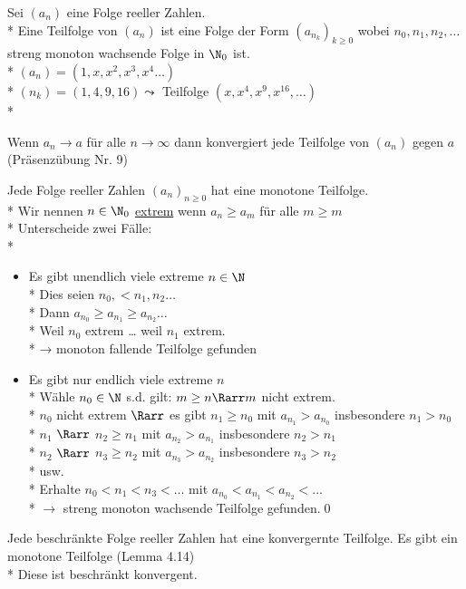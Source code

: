 Sei $(a_n)$ eine Folge reeller Zahlen.\\*
Eine Teilfolge von $(a_n)$ ist eine Folge der Form $(a_{n_k})_{k \geq 0}$ wobei $n_0, n_1, n_2,…$ streng monoton wachsende Folge in $\N_0$ ist.\\*
\bsp
$(a_n) = (1, x, x^2, x^3 , x^4 …)$\\*
$(n_k) = (1, 4, 9, 16) \leadsto $ Teilfolge $(x, x^4, x^9, x^{16} ,…)$\\*

Wenn $a_n \to a$ für alle $n \to \infty$ dann konvergiert jede Teilfolge von $(a_n)$ gegen $a$ (Präsenzübung Nr. 9)

Jede Folge reeller Zahlen $(a_n)_{n\geq 0}$ hat eine monotone Teilfolge.\\*
%
\bew
Wir nennen $n\in \N_0$ \underline{extrem} wenn $a_n \geq a_m$ für alle $m \geq m$\\*
Unterscheide zwei Fälle:\\*
\begin{itemize}
    \item{Es gibt unendlich viele extreme $n \in \N$\\*
Dies seien $n_0, < n_1, n_2…$\\*
Dann $a_{n_0} \geq a_{n_1} \geq a_{n_2} …$\\*
Weil $n_0$ extrem … weil $n_1$ extrem.\\*
→ monoton fallende Teilfolge gefunden}
    \item{Es gibt nur endlich viele extreme $n$\\*
Wähle $n_0 \in \N$ s.d. gilt: $m \geq n \Rarr m$ nicht extrem.\\*
$n_0$ nicht extrem $\Rarr$ es gibt $n_1 \geq n_0$ mit $a_{n_1} > a_{n_0}$ insbesondere $n_1 > n_0$\\*
$n_1$ \phantom{nicht extrem }$\Rarr$ \phantom{es gibt }$n_2 \geq n_1$ mit $a_{n_2} > a_{n_1}$ insbesondere $n_2 > n_1$\\*
$n_2$ \phantom{nicht extrem }$\Rarr$ \phantom{es gibt }$n_3 \geq n_2$ mit $a_{n_3} > a_{n_2}$ insbesondere $n_3 > n_2$\\*
usw.\\*
Erhalte $n_0 < n_1 < n_3 < …$ mit $a_{n_0} < a_{n_1} < a_{n_2} < …$ \\*
$\to $ streng monoton wachsende Teilfolge gefunden.\qed
}
\end{itemize}

Jede beschränkte Folge reeller Zahlen hat eine konvergernte Teilfolge.
\bew
Es gibt ein monotone Teilfolge (Lemma 4.14)\\*
Diese ist beschränkt \Rarr konvergent.

